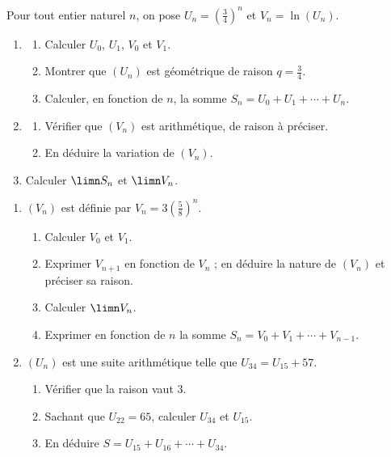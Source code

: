 \begin{annales}
Pour tout entier naturel $n$, on pose $U_{n} = \left(\frac34\right)^{n}$ et
$V_{n} = \ln\left(U_{n}\right)$.
\begin{enumerate}[label=\textbf{\arabic*)}, leftmargin=*, itemsep=0.15em]
  \item \begin{enumerate}[label=\textbf{\alph*)}, leftmargin=1.4em]
          \item Calculer $U_{0}$, $U_{1}$, $V_{0}$ et $V_{1}$.
          \item Montrer que $\left(U_{n}\right)$ est géométrique de raison
                $q = \frac34$.
          \item Calculer, en fonction de $n$, la somme
                $S_{n} = U_{0}+U_{1}+\cdots+U_{n}$.
        \end{enumerate}
  \item \begin{enumerate}[label=\textbf{\alph*)}, leftmargin=1.4em]
          \item Vérifier que $\left(V_{n}\right)$ est arithmétique, de raison
                à préciser.
          \item En déduire la variation de $\left(V_{n}\right)$.
        \end{enumerate}
  \item Calculer $\limn S_{n}$ et $\limn V_{n}$.
\end{enumerate}

\begin{enumerate}[label=\textbf{\arabic*)}, leftmargin=*, itemsep=0.15em]
  \item $\left(V_{n}\right)$ est définie par
        $V_{n} = 3\left(\frac58\right)^{n}$.
        \begin{enumerate}[label=\textbf{\alph*)}, leftmargin=1.4em]
          \item Calculer $V_{0}$ et $V_{1}$.
          \item Exprimer $V_{n+1}$ en fonction de $V_{n}$ ; en déduire la
                nature de $\left(V_{n}\right)$ et préciser sa raison.
          \item Calculer $\limn V_{n}$.
          \item Exprimer en fonction de $n$ la somme
                $S_{n} = V_{0}+V_{1}+\cdots+V_{n-1}$.
        \end{enumerate}
  \item $\left(U_{n}\right)$ est une suite arithmétique telle que
        $U_{34} = U_{15}+57$.
        \begin{enumerate}[label=\textbf{\alph*)}, leftmargin=1.4em]
          \item Vérifier que la raison vaut $3$.
          \item Sachant que $U_{22} = 65$, calculer $U_{34}$ et $U_{15}$.
          \item En déduire $S = U_{15}+U_{16}+\cdots+U_{34}$.
        \end{enumerate}
\end{enumerate}


\end{annales}
